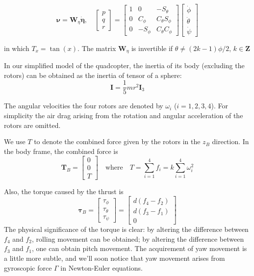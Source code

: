 \begin{equation}
\boldsymbol{\nu}=\boldsymbol{W}_{\eta} \dot{\boldsymbol{\eta}}, \quad\left[\begin{array}{c}
p \\
q \\
r
\end{array}\right]=\left[\begin{array}{ccc}
1 & 0 & -S_{\theta} \\
0 & C_{\phi} & C_{\theta} S_{\phi} \\
0 & -S_{\phi} & C_{\theta} C_{\phi}
\end{array}\right]\left[\begin{array}{c}
\dot{\phi} \\
\dot{\theta} \\
\dot{\psi}
\end{array}\right]
\end{equation}

in which $T_{x}=\tan (x)$. The matrix $\boldsymbol{W}_{\eta}$ is invertible if $\theta \neq (2 k-1) \phi / 2$, $k \in \mathbf{Z}$

In our simplified model of the quadcopter, the inertia of its body (excluding the rotors) can be obtained as the inertia of tensor of a sphere:
\begin{equation}
\boldsymbol{I} = \frac{1}{5}mr^2 \boldsymbol{I}_3
\end{equation}

The angular velocities the four rotors are denoted by $\omega_i$ ($i = 1, 2, 3, 4$). For simplicity the air drag arising from the rotation and angular acceleration of the rotors are omitted.

We use $T$ to denote the combined force given by the rotors in the $z_B$ direction. In the body frame, the combined force is
\begin{equation}
\boldsymbol{T}_{B}=\left[\begin{array}{l}
0 \\
0 \\
T
\end{array}\right]
\quad \text{where} \quad
T=\sum_{i=1}^{4} f_{i}=k \sum_{i=1}^{4} \omega_{i}^{2}
\end{equation}

Also, the torque caused by the thrust is
\begin{equation}
\boldsymbol{\tau}_{B}=\left[\begin{array}{c}
\tau_{\phi} \\
\tau_{\theta} \\
\tau_{\psi}
\end{array}\right]=\left[\begin{array}{c}
d(f_4 - f_2) \\
d(f_3 - f_1) \\
0
\end{array}\right]
\end{equation}
The physical significance of the torque is clear: by altering the difference between $f_4$ and $f_2$, rolling movement can be obtained; by altering the difference between $f_3$ and $f_1$, one can obtain pitch movement.
The acquirement of yaw movement is a little more subtle, and we'll soon notice that yaw movement arises from gyroscopic force $\Gamma$ in Newton-Euler equations.

